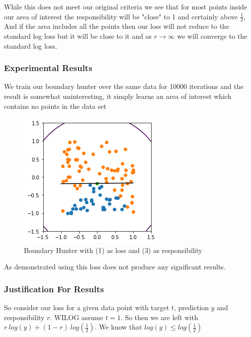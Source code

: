 \documentclass{article}
\begin{document}
While this does not meet our original criteria we see that for most points inside our area of interest the responsibility will be "close" to 1 and certainly above $\frac{1}{2}$, And if the area includes all the points then our loss will not reduce to the standard log loss but it will be close to it and as $r \to\infty$ we will converge to the standard log loss.

\subsubsection{Experimental Results}
We train our boundary hunter over the same data for 10000 iterations and the result is somewhat uninteresting, it simply learns an area of interest which contains no points in the data set

\begin{figure}[H]
\centering
  \begin{minipage}[b]{0.4\textwidth}
    \includegraphics[width=\textwidth]{BoundaryHunter-Attempt1-01.png}
    \caption{Boundary Hunter with (1) as loss and (3) as responsibility}
  \end{minipage}
  \hfill
\end{figure}

As demonstrated using this loss does not produce any significant results.

\subsubsection{Justification For Results}
So consider our loss for a given data point with target $t$, prediction $y$ and responsibility $r$. WILOG assume $t = 1$. So then we are left with $r\ log(y) + (1-r)\ log(\frac{1}{2})$. We know that $log(y) \leq log(\frac{1}{2})$
\end{document}
